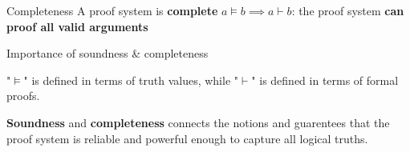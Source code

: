 \documentclass{article}
\begin{document}
\begin{theorem}
    {Completeness}
    A proof system is \textbf{complete} $a \models b \implies a \vdash b$: the proof system \textbf{can proof all valid arguments}
\end{theorem}

\begin{knBox}
    {Importance of soundness \& completeness}

    "$\models$" is defined in terms of truth values, while "$\vdash$" is defined in terms of formal proofs.

    \textbf{Soundness} and \textbf{completeness} connects the notions and guarentees that the proof system is reliable and powerful enough to capture all logical truths.
\end{knBox}

\end{document}
